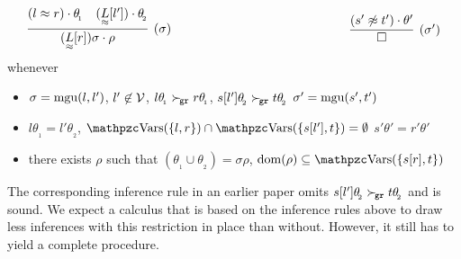    \begin{definition}\label{def:unit:superposition:on:closures}
    \begin{gather*}
        \infer[(\sigma)]
        {(\underset{\mEQ}{L}[r])\sigma\cdot\rho}
        {(l\mEQ r)\cdot\theta_{\!_1} & (\underset{\mEQ}{L}[l'])\cdot\theta_{\!_2}}
    \hspace{5cm}
        \infer[(\sigma')]
        {\emptyclause}
        {(s'\mNE t')\cdot\theta'}
    \end{gather*}
    whenever
    \begin{itemize}
        \item
        \( \sigma = \operatorname{mgu}(l,l') \),
        \( l'\not\in\mathcal{V} \),
        \( l\theta_{\!_1} \mathrel\succ_{\!\mathtt{gr}} r\theta_{\!_1} \),
        \( s[l']\theta_{\!_2} \mathrel\succ_{\!\mathtt{gr}} t\theta_{\!_2} \)
        \hfill \( \sigma' = \operatorname{mgu}(s',t') \)
        \item
        \( l\theta_{\!_1} = l'\theta_{\!_2} \),
        \( \var(\{l,r\}) \cap \var(\{ s[l'],t \}) = \emptyset \)
        \hfill \( s'\theta' = r'\theta' \)
        \item there exists
        \( \rho \) such that
        \( (\theta_{\!_1}\cup\theta_{\!_2}) = \sigma\rho \),
        \( \domain(\rho) \subseteq \var(\{ s[r],t \}) \)
    \end{itemize}
   \end{definition}

   \begin{remark}
    The corresponding inference rule in an earlier paper \cite{GK2004csl}
    omits \( s[l']\theta_{\!_2} \mathrel\succ_{\!\mathtt{gr}} t\theta_{\!_2} \) and is sound.
    We expect a calculus that is based on the inference rules above 
    to draw less inferences with this restriction in place
    than without. However, it still has to yield a complete procedure.
   \end{remark}

